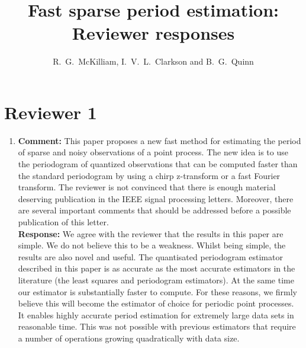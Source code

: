 \documentclass[a4paper,10pt]{article}
\title{Fast sparse period estimation: Reviewer responses}
\author{R.~G.~McKilliam, I.~V.~L.~Clarkson and B.~G.~Quinn 
}
\begin{document}
\maketitle


\section*{Reviewer 1}\label{sec:reviewer-1}

\begin{enumerate}
 
\item\textbf{Comment:}
This paper proposes a new fast method for estimating the period of sparse and noisy
observations of a point process. The new idea is to use the periodogram of quantized
observations that can be computed faster than the standard periodogram by using
a chirp z-transform or a fast Fourier transform. The reviewer is not convinced that
there is enough material deserving publication in the IEEE signal processing letters.
Moreover, there are several important comments that should be addressed before a
possible publication of this letter.
\\
\textbf{Response:}
We agree with the reviewer that the results in this paper are simple.  We do not believe this to be a weakness. Whilst being simple, the results are also novel and useful.  The quantisated periodogram estimator described in this paper is as accurate as the most accurate estimators in the literature (the least squares and periodogram estimators).  At the same time our estimator is substantially faster to compute.  For these reasons, we firmly believe this will become the estimator of choice for periodic point processes.  It enables highly accurate period estimation for extremely large data sets in reasonable time. This was not possible with previous estimators that require a number of operations growing quadratically with data size. %


\end{enumerate}
\end{document}

